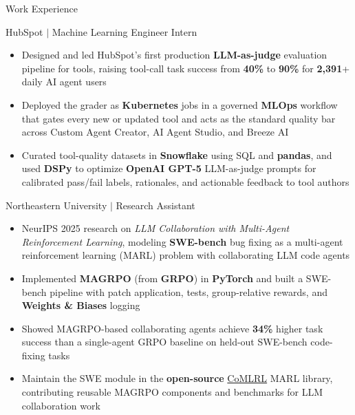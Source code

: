 \documentclass{article}
\newlength{\tabin}
\newlength{\secsep}
\newcommand{\lineunder}{\vspace*{-8pt} \\ \hspace*{-6pt} \hrulefill \\ \vspace*{-15pt}}
\newenvironment{tabbedsection}[1]{
  \begin{list}{}{
      \setlength{\itemsep}{0pt}
      \setlength{\labelsep}{0pt}
      \setlength{\labelwidth}{0pt}
      \setlength{\leftmargin}{\tabin}
      \setlength{\rightmargin}{\tabin}
      \setlength{\listparindent}{0pt}
      \setlength{\parsep}{0pt}
      \setlength{\parskip}{0pt}
      \setlength{\partopsep}{0pt}
      \setlength{\topsep}{#1}
    }
  \item[]
}{\end{list}}
\newenvironment{resume_section}[1]{
  \filbreak
  \vspace{2\secsep}
  \textsc{\large#1}
  \lineunder
  \begin{tabbedsection}{\secsep}
}{\end{tabbedsection}}
\newenvironment{resume_subsection}[2][]{
  \textbf{#2} \hfill {\footnotesize #1} \hspace{-3em}
  \begin{tabbedsection}{0.5\secsep}
}{\end{tabbedsection}}
\newenvironment{subitems}{
  \renewcommand{\labelitemi}{-}
  \begin{itemize}
      \setlength{\labelsep}{1em}
      \fontsize{10.4pt}{11pt}\selectfont
}{\end{itemize}}
\begin{document}
\begin{resume_section}{Work Experience}

    \begin{resume_subsection}{HubSpot $|$ Machine Learning Engineer Intern}
        \begin{subitems}
            \item Designed and led HubSpot’s first production \textbf{LLM-as-judge} evaluation pipeline for tools, raising tool-call task success from \textbf{40\%} to \textbf{90\%} for \textbf{2,391}+ daily AI agent users
            \item Deployed the grader as \textbf{Kubernetes} jobs in a governed \textbf{MLOps} workflow that gates every new or updated tool and acts as the standard quality bar across Custom Agent Creator, AI Agent Studio, and Breeze AI
            \item Curated tool-quality datasets in \textbf{Snowflake} using SQL and \textbf{pandas}, and used \textbf{DSPy} to optimize \textbf{OpenAI GPT-5} LLM-as-judge prompts for calibrated pass/fail labels, rationales, and actionable feedback to tool authors
        \end{subitems}
    \end{resume_subsection}

    \begin{resume_subsection}{Northeastern University $|$ Research Assistant}
        \begin{subitems}
            \item NeurIPS 2025 research on \textit{LLM Collaboration with Multi-Agent Reinforcement Learning}, modeling \textbf{SWE-bench} bug fixing as a multi-agent reinforcement learning (MARL) problem with collaborating LLM code agents
            \item Implemented \textbf{MAGRPO} (from \textbf{GRPO}) in \textbf{PyTorch} and built a SWE-bench pipeline with patch application, tests, group-relative rewards, and \textbf{Weights \& Biases} logging
            \item Showed MAGRPO-based collaborating agents achieve \textbf{34\%} higher task success than a single-agent GRPO baseline on held-out SWE-bench code-fixing tasks
            \item Maintain the SWE module in the \textbf{open-source} \href{https://github.com/OpenMLRL}{CoMLRL} MARL library, contributing reusable MAGRPO components and benchmarks for LLM collaboration work
        \end{subitems}
    \end{resume_subsection}


\end{resume_section}
\end{document}

